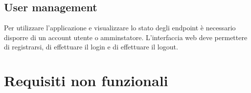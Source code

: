 \documentclass{article}
\begin{document}
\subsection{User management}

Per utilizzare l'applicazione e visualizzare lo stato degli endpoint è necessario disporre di un account utente o amminstatore.
L'interfaccia web deve permettere di registrarsi, di effettuare il login e di effettuare il logout.











\section{Requisiti non funzionali}
\label{sec:requisiti_non_funzionali}
\end{document}
